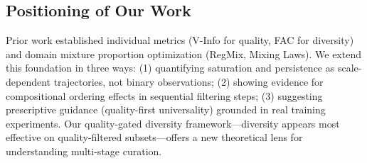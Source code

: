 \subsection{Positioning of Our Work}

Prior work established individual metrics (V-Info for quality, FAC for diversity) and domain mixture proportion optimization (RegMix, Mixing Laws). We extend this foundation in three ways: (1) quantifying saturation and persistence as scale-dependent trajectories, not binary observations; (2) showing evidence for compositional ordering effects in sequential filtering steps; (3) suggesting prescriptive guidance (quality-first universality) grounded in real training experiments. Our quality-gated diversity framework---diversity appears most effective on quality-filtered subsets---offers a new theoretical lens for understanding multi-stage curation.
